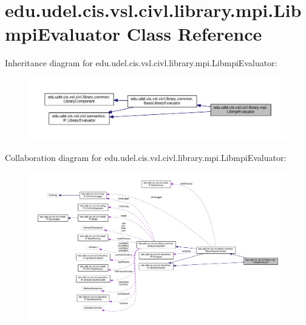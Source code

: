 \hypertarget{classedu_1_1udel_1_1cis_1_1vsl_1_1civl_1_1library_1_1mpi_1_1LibmpiEvaluator}{}\section{edu.\+udel.\+cis.\+vsl.\+civl.\+library.\+mpi.\+Libmpi\+Evaluator Class Reference}
\label{classedu_1_1udel_1_1cis_1_1vsl_1_1civl_1_1library_1_1mpi_1_1LibmpiEvaluator}


Inheritance diagram for edu.\+udel.\+cis.\+vsl.\+civl.\+library.\+mpi.\+Libmpi\+Evaluator\+:
\nopagebreak
\begin{figure}[H]
\begin{center}
\leavevmode
\includegraphics[width=350pt]{classedu_1_1udel_1_1cis_1_1vsl_1_1civl_1_1library_1_1mpi_1_1LibmpiEvaluator__inherit__graph}
\end{center}
\end{figure}


Collaboration diagram for edu.\+udel.\+cis.\+vsl.\+civl.\+library.\+mpi.\+Libmpi\+Evaluator\+:
\nopagebreak
\begin{figure}[H]
\begin{center}
\leavevmode
\includegraphics[width=350pt]{classedu_1_1udel_1_1cis_1_1vsl_1_1civl_1_1library_1_1mpi_1_1LibmpiEvaluator__coll__graph}
\end{center}
\end{figure}

